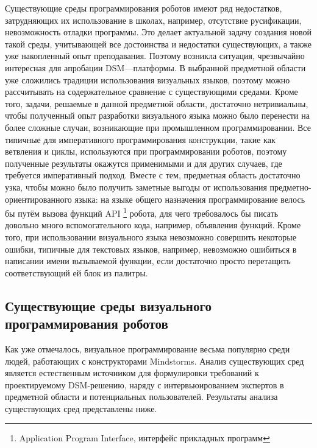 Существующие среды программирования роботов имеют ряд недостатков, затрудняющих их 
использование в школах, например, отсутствие русификации, невозможность отладки программы. 
Это делает актуальной задачу создания новой такой среды, учитывающей все достоинства и 
недостатки существующих, а также уже накопленный опыт преподавания. Поэтому возникла 
ситуация, чрезвычайно интересная для апробации DSM---платформы. В выбранной предметной 
области уже сложились традиции использования визуальных языков, поэтому можно рассчитывать 
на содержательное сравнение с существующими средами. Кроме того, задачи, решаемые в 
данной предметной области, достаточно нетривиальны, чтобы полученный опыт разработки 
визуального языка можно было перенести на более сложные случаи, возникающие при промышленном 
программировании. Все типичные для императивного программирования конструкции, такие 
как ветвления и циклы, используются при программировании роботов, поэтому полученные 
результаты окажутся применимыми и для других случаев, где требуется императивный подход. 
Вместе с тем, предметная область достаточно узка, чтобы можно было получить заметные 
выгоды от использования предметно-ориентированного языка: на языке общего назначения программирование велось бы путём вызова функций API
\footnote{Application Program Interface, интерфейс прикладных программ}
 робота, для чего требовалось бы писать довольно много вспомогательного кода, например, объявления функций. Кроме того,
 при использовании визуального языка невозможно совершить некоторые ошибки, типичные 
для текстовых языков, например, невозможно ошибиться в написании имени вызываемой 
функции, если достаточно просто перетащить соответствующий ей блок из палитры.

\subsection{Существующие среды визуального программирования роботов}
Как уже отмечалось, визуальное программирование весьма популярно среди людей, работающих 
с конструкторами Mindstorms. Анализ существующих сред является естественным источником 
для формулировки требований к проектируемому DSM-решению, наряду с интервьюированием 
экспертов в предметной области и потенциальных пользователей. Результаты анализа 
существующих сред представлены ниже.

